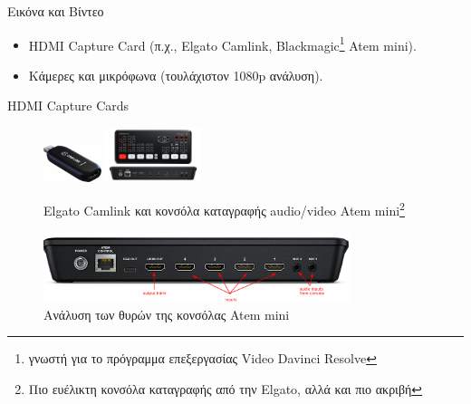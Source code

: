 \documentclass[aspectratio=169]{beamer}
\begin{document}
\begin{frame}[allowframebreaks]{Εικόνα και Βίντεο}

  \begin{itemize}
  \item HDMI Capture Card (π.χ., Elgato Camlink, Blackmagic\footnote{γνωστή για το πρόγραμμα επεξεργασίας Video Davinci Resolve} Atem mini).
  \item Κάμερες και μικρόφωνα (τουλάχιστον 1080p ανάλυση).
  \end{itemize}
  \begin{block}{HDMI Capture Cards}
      \begin{figure}
    \centering
    \includegraphics[width=0.15\textwidth]{images/elgato.jpeg}
    \includegraphics[width=0.25\textwidth]{images/atem.jpg}
    \caption{Elgato Camlink και κονσόλα καταγραφής audio/video Atem mini\footnote{Πιο ευέλικτη κονσόλα καταγραφής από την Elgato, αλλά και πιο ακριβή}}
    \end{figure}
  \end{block}
    \begin{figure}
    \centering
    \includegraphics[width=0.8\textwidth]{images/atem_explanation.png}
    \caption{Ανάλυση των θυρών της κονσόλας Atem mini}
    \end{figure}
\end{frame}
\end{document}
